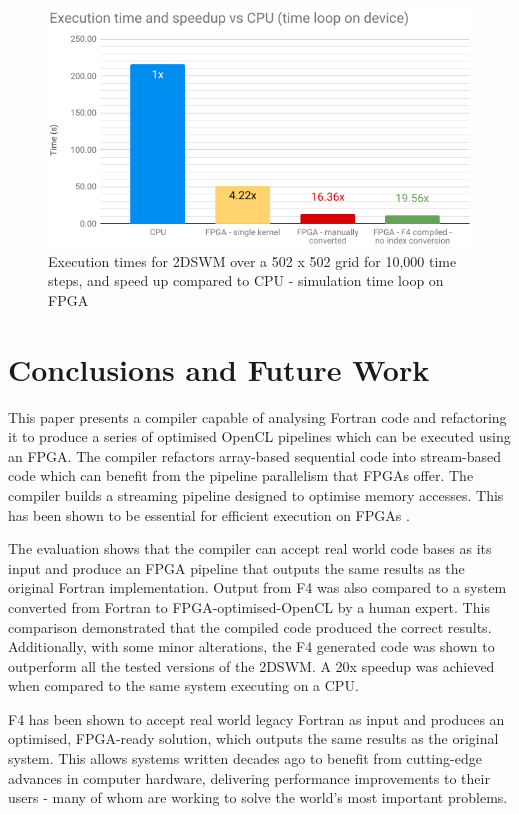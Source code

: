 \documentclass{mpaper}
\begin{document}
\begin{figure}
    \centering
    \includegraphics[scale=0.40]{images/Execution_Time_and_Speedup_vs_CPU_device_time_loop.png}
    \caption{Execution times for 2DSWM over a 502 x 502 grid for 10,000 time steps, and speed up compared to CPU - simulation time loop on FPGA}
    \label{fig:exec_perf_device_time_loop}
\end{figure}

\section{Conclusions and Future Work}

This paper presents a compiler capable of analysing Fortran code and refactoring it to produce a series of optimised OpenCL pipelines which can be executed using an FPGA. 
The compiler refactors array-based sequential code into stream-based code which can benefit from the pipeline parallelism that FPGAs offer. 
The compiler builds a streaming pipeline designed to optimise memory accesses. This has been shown to be essential for efficient execution on FPGAs \cite{VanderbauwhedeNabi2018}. 

The evaluation shows that the compiler can accept real world code bases as its input and produce an FPGA pipeline that outputs the same results as the original Fortran implementation.
Output from F4 was also compared to a system converted from Fortran to FPGA-optimised-OpenCL by a human expert.
This comparison demonstrated that the compiled code produced the correct results.
Additionally, with some minor alterations, the F4 generated code was shown to outperform all the tested versions of the 2DSWM.
A 20x speedup was achieved when compared to the same system executing on a CPU. 

F4 has been shown to accept real world legacy Fortran as input and produces an optimised, FPGA-ready solution, which outputs the same results as the original system. 
This allows systems written decades ago to benefit from cutting-edge advances in computer hardware, delivering performance improvements to their users - many of whom are working to solve the world's most important problems.
\end{document}

